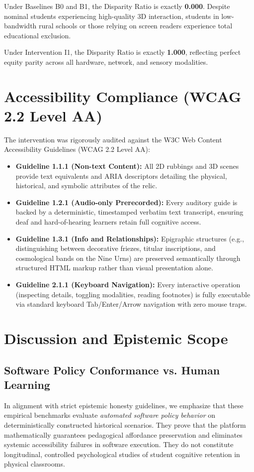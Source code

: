 \documentclass[11pt,a4paper]{article}
\begin{document}
Under Baselines B0 and B1, the Disparity Ratio is exactly \textbf{0.000}. Despite nominal students experiencing high-quality 3D interaction, students in low-bandwidth rural schools or those relying on screen readers experience total educational exclusion. 

Under Intervention I1, the Disparity Ratio is exactly \textbf{1.000}, reflecting perfect equity parity across all hardware, network, and sensory modalities.

\section{Accessibility Compliance (WCAG 2.2 Level AA)}

The intervention was rigorously audited against the W3C Web Content Accessibility Guidelines (WCAG 2.2 Level AA):
\begin{itemize}
    \item \textbf{Guideline 1.1.1 (Non-text Content):} All 2D rubbings and 3D scenes provide text equivalents and ARIA descriptors detailing the physical, historical, and symbolic attributes of the relic.
    \item \textbf{Guideline 1.2.1 (Audio-only Prerecorded):} Every auditory guide is backed by a deterministic, timestamped verbatim text transcript, ensuring deaf and hard-of-hearing learners retain full cognitive access.
    \item \textbf{Guideline 1.3.1 (Info and Relationships):} Epigraphic structures (e.g., distinguishing between decorative friezes, titular inscriptions, and cosmological bands on the Nine Urns) are preserved semantically through structured HTML markup rather than visual presentation alone.
    \item \textbf{Guideline 2.1.1 (Keyboard Navigation):} Every interactive operation (inspecting details, toggling modalities, reading footnotes) is fully executable via standard keyboard Tab/Enter/Arrow navigation with zero mouse traps.
\end{itemize}

\section{Discussion and Epistemic Scope}

\subsection{Software Policy Conformance vs. Human Learning}
In alignment with strict epistemic honesty guidelines, we emphasize that these empirical benchmarks evaluate \textit{automated software policy behavior} on deterministically constructed historical scenarios. They prove that the platform mathematically guarantees pedagogical affordance preservation and eliminates systemic accessibility failures in software execution. They do not constitute longitudinal, controlled psychological studies of student cognitive retention in physical classrooms.
\end{document}
